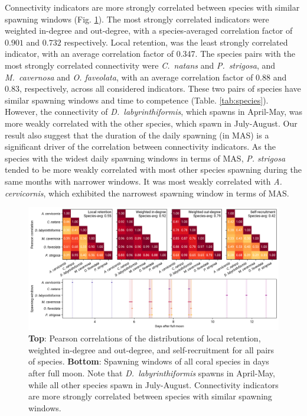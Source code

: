 \documentclass[preprint,12pt,authoryear]{elsarticle}
\begin{document}
	Connectivity indicators are more strongly correlated between species with similar spawning windows (Fig. \ref{fig:correlation}). The most strongly correlated indicators were weighted in-degree and out-degree, with a species-averaged correlation factor of $0.901$ and $0.732$ respectively. Local retention, was the least strongly correlated indicator, with an average correlation factor of 0.347. The species pairs with the most strongly correlated connectivity were \textit{C.~natans} and \textit{P.~strigosa}, and \textit{M.~cavernosa} and \textit{O. faveolata}, with an average correlation factor of 0.88 and 0.83, respectively, across all considered indicators. These two pairs of species have similar spawning windows and time to competence (Table. \ref{tab:species}). However, the connectivity of \textit{D.~labyrinthiformis}, which spawns in April-May, was more weakly correlated with the other species, which spawn in July-August. Our result also suggest that the duration of the daily spawning (in MAS) is a significant driver of the correlation between connectivity indicators. As the species with the widest daily spawning windows in terms of MAS, \textit{P. strigosa} tended to be more weakly correlated with most other species spawning during the same months with narrower windows. It was most weakly correlated with \textit{A. cervicornis}, which exhibited the narrowest spawning window in terms of MAS.
	
	
	\begin{figure}
		\centering
		\includegraphics[width=\textwidth]{figures/fig_correlation.png}
		\caption{\textbf{Top}: Pearson correlations of the distributions of local retention, weighted in-degree and out-degree, and self-recruitment for all pairs of species. \textbf{Bottom}: Spawning windows of all coral species in days after full moon. Note that \textit{D.~labyrinthiformis} spawns in April-May, while all other species spawn in July-August. Connectivity indicators are more strongly correlated between species with similar spawning windows.}\label{fig:correlation}
	\end{figure}
	
\end{document}
